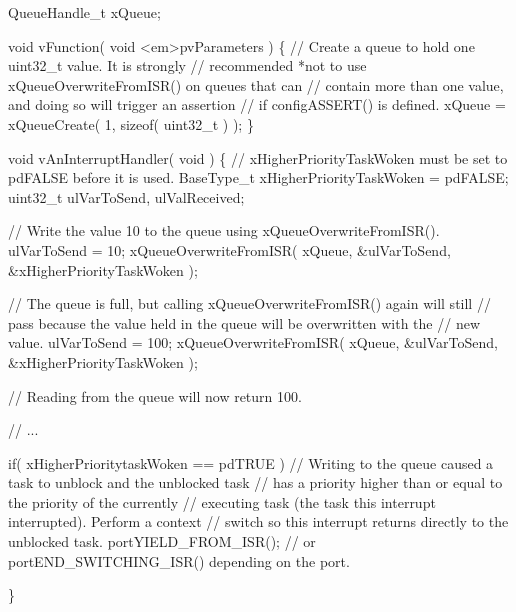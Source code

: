 \begin{DoxyPre} QueueHandle\_t xQueue;\end{DoxyPre}



\begin{DoxyPre} void vFunction( void <em>pvParameters )
 \{
    // Create a queue to hold one uint32\_t value.  It is strongly
    // recommended *not to use xQueueOverwriteFromISR() on queues that can
    // contain more than one value, and doing so will trigger an assertion
    // if configASSERT() is defined.
    xQueue = xQueueCreate( 1, sizeof( uint32\_t ) );
\}\end{DoxyPre}



\begin{DoxyPre}void vAnInterruptHandler( void )
\{
// xHigherPriorityTaskWoken must be set to pdFALSE before it is used.
BaseType\_t xHigherPriorityTaskWoken = pdFALSE;
uint32\_t ulVarToSend, ulValReceived;
\begin{DoxyVerb}// Write the value 10 to the queue using xQueueOverwriteFromISR().
ulVarToSend = 10;
xQueueOverwriteFromISR( xQueue, &ulVarToSend, &xHigherPriorityTaskWoken );

// The queue is full, but calling xQueueOverwriteFromISR() again will still
// pass because the value held in the queue will be overwritten with the
// new value.
ulVarToSend = 100;
xQueueOverwriteFromISR( xQueue, &ulVarToSend, &xHigherPriorityTaskWoken );

// Reading from the queue will now return 100.

// ...

if( xHigherPrioritytaskWoken == pdTRUE )
{
    // Writing to the queue caused a task to unblock and the unblocked task
    // has a priority higher than or equal to the priority of the currently
    // executing task (the task this interrupt interrupted).  Perform a context
    // switch so this interrupt returns directly to the unblocked task.
    portYIELD_FROM_ISR(); // or portEND_SWITCHING_ISR() depending on the port.
}
\end{DoxyVerb}

\}
 \end{DoxyPre}
 
